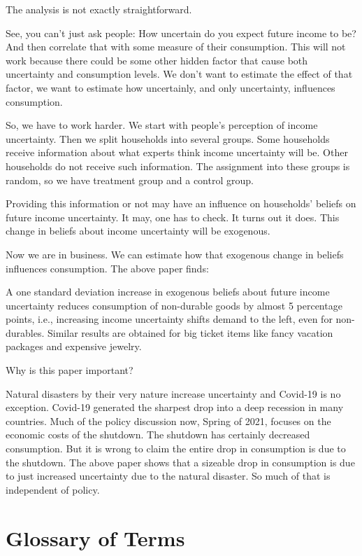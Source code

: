 \documentclass[
]{book}
\begin{document}
The analysis is not exactly straightforward.

See, you can't just ask people: How uncertain do you expect future income to be? And then correlate that with some measure of their consumption. This will not work because there could be some other hidden factor that cause both uncertainty and consumption levels. We don't want to estimate the effect of that factor, we want to estimate how uncertainly, and only uncertainty, influences consumption.

So, we have to work harder. We start with people's perception of income uncertainty. Then we split households into several groups. Some households receive information about what experts think income uncertainty will be. Other households do not receive such information. The assignment into these groups is random, so we have treatment group and a control group.

Providing this information or not may have an influence on households' beliefs on future income uncertainty. It may, one has to check. It turns out it does. This change in beliefs about income uncertainty will be exogenous.

Now we are in business. We can estimate how that exogenous change in beliefs influences consumption. The above paper finds:

A one standard deviation increase in exogenous beliefs about future income uncertainty reduces consumption of non-durable goods by almost 5 percentage points, i.e., increasing income uncertainty shifts demand to the left, even for non-durables. Similar results are obtained for big ticket items like fancy vacation packages and expensive jewelry.

Why is this paper important?

Natural disasters by their very nature increase uncertainty and Covid-19 is no exception. Covid-19 generated the sharpest drop into a deep recession in many countries. Much of the policy discussion now, Spring of 2021, focuses on the economic costs of the shutdown. The shutdown has certainly decreased consumption. But it is wrong to claim the entire drop in consumption is due to the shutdown. The above paper shows that a sizeable drop in consumption is due to just increased uncertainty due to the natural disaster. So much of that is independent of policy.

\hypertarget{glossary-of-terms-3}{%
\section{Glossary of Terms}\label{glossary-of-terms-3}}
\end{document}

